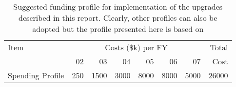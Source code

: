 \documentclass{article}
\begin{document}
\begin {table}
\begin {tabular}{|l|rrrrrr|r|}
\hline
Item & \multicolumn {6}{c}{Costs (\$k) per FY} & Total\\
     & 02 & 03 & 04 & 05 & 06 & 07 & Cost \\
\hline
Spending Profile     & 250 & 1500 & 3000 & 8000 & 8000 & 5000 & 26000 \\
\hline
\end {tabular}
\caption { \label {tab:fundingprof} Suggested funding profile for 
implementation of the upgrades described in this report. Clearly, other
profiles can also be adopted but the profile presented here is based on
}
\end{table}
\end{document}

